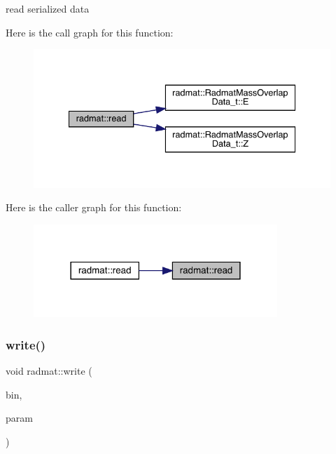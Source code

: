 read serialized data 

Here is the call graph for this function\+:
\nopagebreak
\begin{figure}[H]
\begin{center}
\leavevmode
\includegraphics[width=335pt]{d4/d83/namespaceradmat_a48bba8fb1d24a49efdc5eed962710717_cgraph}
\end{center}
\end{figure}
Here is the caller graph for this function\+:
\nopagebreak
\begin{figure}[H]
\begin{center}
\leavevmode
\includegraphics[width=261pt]{d4/d83/namespaceradmat_a48bba8fb1d24a49efdc5eed962710717_icgraph}
\end{center}
\end{figure}
\mbox{\label{namespaceradmat_a2ca0177bbaa4c0cfe7505fd997dae1f1}} 
\subsubsection{\texorpdfstring{write()}{write()}\hspace{0.1cm}{\footnotesize\ttfamily [1/3]}}
{\footnotesize\ttfamily void radmat\+::write (\begin{DoxyParamCaption}\item[{A\+D\+A\+T\+I\+O\+::\+Binary\+Writer \&}]{bin,  }\item[{const \mbox{\hyperlink{structradmat_1_1RadmatExtendedKeyHadronNPartIrrep__t}{Radmat\+Extended\+Key\+Hadron\+N\+Part\+Irrep\+\_\+t}} \&}]{param }\end{DoxyParamCaption})}



